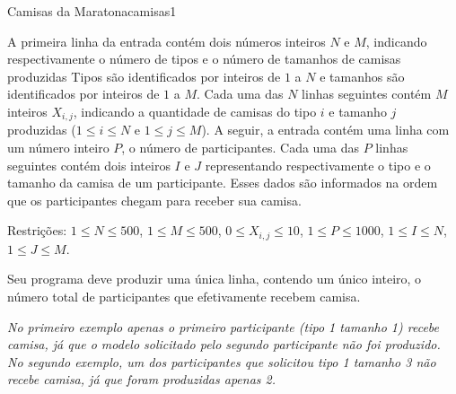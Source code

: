 \documentclass[12pt,a4paper,oneside]{article}
\begin{document}
\begin{problem}{Camisas da Maratona}{camisas}{1}


\InputFile

A primeira linha da entrada contém dois números inteiros $N$ e $M$, indicando respectivamente o número de tipos e o número de tamanhos de camisas produzidas Tipos são identificados por inteiros de $1$ a $N$ e tamanhos são identificados por inteiros de $1$ a $M$. Cada uma das $N$ linhas seguintes contém $M$ inteiros $X_{i,j}$, indicando a quantidade de camisas do tipo $i$ e tamanho $j$ produzidas ($1 \leq i \leq N$ e $1 \leq j \leq M$). A seguir, a entrada contém uma linha com um número inteiro $P$, o número de participantes. Cada uma das $P$ linhas seguintes contém dois inteiros $I$ e $J$ representando respectivamente o tipo e o tamanho da camisa de um participante. Esses dados são informados na ordem que os participantes chegam para receber sua camisa.

Restrições: $1 \leq N \leq 500$, $1 \leq M \leq 500$, $0 \leq X_{i,j} \leq 10$, $1 \leq P \leq 1000$, $1 \leq I \leq N$, $1 \leq J \leq M$.

\OutputFile

Seu programa deve produzir uma única linha, contendo um único inteiro, o número total de participantes que efetivamente recebem camisa.


\Example

\begin{example}
%
\end{example}

\begin{example}
%
\end{example}


\textit{No primeiro exemplo apenas o primeiro participante (tipo 1 tamanho 1) recebe camisa, já que o modelo solicitado pelo segundo participante não foi produzido. No segundo exemplo, um dos participantes que solicitou tipo 1 tamanho 3 não recebe camisa, já que foram produzidas apenas 2.}

\end{problem}
\end{document}
